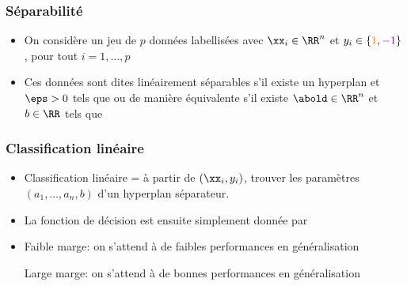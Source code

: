 \documentclass[9pt,table]{beamer} %
\begin{document}
\begin{frame}
\frametitle{Séparabilité}

\begin{itemize}[label=\tiny$\blacksquare$]
	\item On considère un jeu de $p$ données labellisées  avec $\xx_i \in \RR^n$
	et $y_i \in \{\textcolor{orange}{1},\textcolor{violet}{-1}\}$, pour tout $i=1,\ldots,p$
	
	
	\item Ces données sont dites \alert{linéairement séparables} s'il existe un hyperplan et $\eps > 0$ tels que
	ou de manière équivalente s'il existe $\abold \in \RR^n$ et $b \in \RR$ tels que
\end{itemize}
\end{frame}


\begin{frame}
\frametitle{Classification linéaire}

	\begin{itemize}[label=\tiny$\blacksquare$]
		\item Classification \alert{linéaire} = à partir de $(\xx_i,y_i)$, trouver les paramètres $(a_1,\ldots, a_n,b)$ d'un hyperplan séparateur. %
		
		\item La fonction de décision est ensuite simplement donnée par
		
		\item Faible marge: on s'attend à de faibles performances en généralisation
		
		Large marge: on s'attend à de bonnes performances en généralisation
	\end{itemize}
\end{frame}
\end{document}
